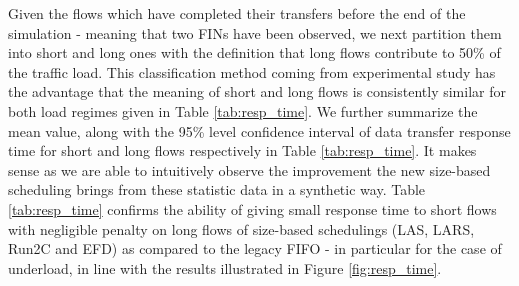 \documentclass[preprint,12pt]{elsarticle}
\begin{document}
Given the flows which have completed their transfers before the end of the simulation - meaning that two FINs have been observed, we next partition them into short and long ones with the definition that long flows contribute to 50\% of the traffic load. This classification method coming from experimental study has the advantage that the meaning of short and long flows is consistently similar for both load regimes given in Table \ref{tab:resp_time}. We further summarize the mean value, along with the 95\% level confidence interval of data transfer response time for short and long flows respectively in Table \ref{tab:resp_time}. It makes sense as we are able to intuitively observe the improvement the new size-based scheduling brings from these statistic data in a synthetic way. Table \ref{tab:resp_time} confirms the ability of giving small response time to short flows with negligible penalty on long flows of size-based schedulings (LAS, LARS, Run2C and EFD) as compared to the legacy FIFO - in particular for the case of underload, in line with the results illustrated in Figure \ref{fig:resp_time}. 


\end{document}
